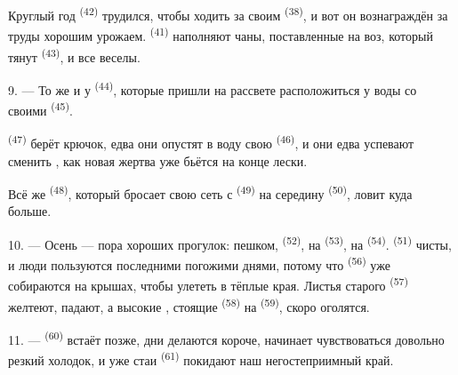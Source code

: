 Круглый год  \textsuperscript{(42)} трудился, чтобы ходить за
своим  \textsuperscript{(38)}, и вот он вознаграждён за
труды хорошим урожаем.  \textsuperscript{(41)} наполняют чаны,
поставленные на воз, который тянут  \textsuperscript{(43)}, и все
веселы.

\VUsaut{5.0mm}
\VUsaut{3.4mm}

9. --- То же и у  \textsuperscript{(44)}, которые пришли на
рассвете расположиться у воды со своими  \textsuperscript{(45)}.

 \textsuperscript{(47)} берёт крючок, едва они опустят в воду свою
 \textsuperscript{(46)}, и они едва успевают сменить ,
как новая жертва уже бьётся на конце лески.

Всё же  \textsuperscript{(48)}, который бросает свою сеть с
 \textsuperscript{(49)} на середину  \textsuperscript{(50)},
ловит куда больше.

10. --- Осень --- пора хороших прогулок: пешком, 
\textsuperscript{(52)}, на  \textsuperscript{(53)}, на
 \textsuperscript{(54)}.  \textsuperscript{(51)}
чисты, и люди пользуются последними погожими днями, потому что
 \textsuperscript{(56)} уже собираются на крышах, чтобы улететь
в тёплые края. Листья старого  \textsuperscript{(57)} желтеют,
 падают, а высокие , стоящие 
\textsuperscript{(58)} на  \textsuperscript{(59)}, скоро
оголятся.

11. ---  \textsuperscript{(60)} встаёт позже, дни делаются короче,
 начинает чувствоваться довольно резкий холодок, и уже
стаи  \textsuperscript{(61)} покидают наш негостеприимный
край.
\VUsaut{6.0mm}
\VUfilet{22mm}
